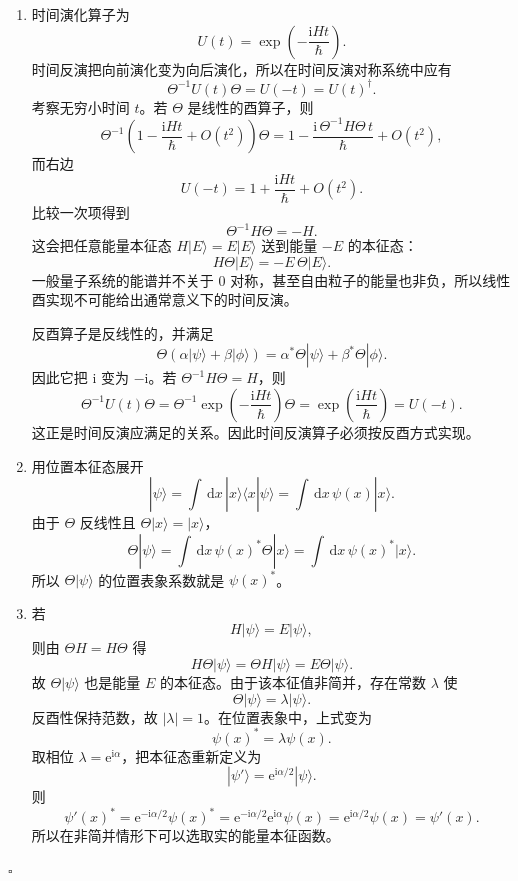 \documentclass[UTF8,12pt]{ctexart}
\newcommand{\dd}{\,\mathrm d}
\newcommand{\ii}{\mathrm i}
\newcommand{\ee}{\mathrm e}
\newenvironment{solution}{%
  \par\medskip
  \noindent{\bfseries 解答}\quad\ignorespaces
}{\hfill$\square$\par\medskip}
\begin{document}
\begin{solution}
\begin{enumerate}[label=(\alph*)]
\item 时间演化算子为
\[
U(t)=\exp\!\left(-\frac{\ii Ht}{\hbar}\right).
\]
时间反演把向前演化变为向后演化，所以在时间反演对称系统中应有
\[
\Theta^{-1}U(t)\Theta=U(-t)=U(t)^\dagger.
\]
考察无穷小时间 \(t\)。若 \(\Theta\) 是线性的酉算子，则
\[
\Theta^{-1}\left(1-\frac{\ii Ht}{\hbar}+O(t^2)\right)\Theta
=1-\frac{\ii\,\Theta^{-1}H\Theta\,t}{\hbar}+O(t^2),
\]
而右边
\[
U(-t)=1+\frac{\ii Ht}{\hbar}+O(t^2).
\]
比较一次项得到
\[
\Theta^{-1}H\Theta=-H.
\]
这会把任意能量本征态 \(H|E\rangle=E|E\rangle\) 送到能量 \(-E\) 的本征态：
\[
H\Theta|E\rangle=-E\,\Theta|E\rangle.
\]
一般量子系统的能谱并不关于 \(0\) 对称，甚至自由粒子的能量也非负，所以线性酉实现不可能给出通常意义下的时间反演。

反酉算子是反线性的，并满足
\[
\Theta(\alpha|\psi\rangle+\beta|\phi\rangle)
=\alpha^*\Theta|\psi\rangle+\beta^*\Theta|\phi\rangle.
\]
因此它把 \(\ii\) 变为 \(-\ii\)。若 \(\Theta^{-1}H\Theta=H\)，则
\[
\Theta^{-1}U(t)\Theta
=\Theta^{-1}\exp\!\left(-\frac{\ii Ht}{\hbar}\right)\Theta
=\exp\!\left(\frac{\ii Ht}{\hbar}\right)=U(-t).
\]
这正是时间反演应满足的关系。因此时间反演算子必须按反酉方式实现。

\item 用位置本征态展开
\[
|\psi\rangle=\int \dd x\, |x\rangle\langle x|\psi\rangle
=\int \dd x\,\psi(x)|x\rangle.
\]
由于 \(\Theta\) 反线性且 \(\Theta|x\rangle=|x\rangle\)，
\[
\Theta|\psi\rangle
=\int \dd x\,\psi(x)^*\Theta|x\rangle
=\int \dd x\,\psi(x)^*|x\rangle.
\]
所以 \(\Theta|\psi\rangle\) 的位置表象系数就是 \(\psi(x)^*\)。

\item 若
\[
H|\psi\rangle=E|\psi\rangle,
\]
则由 \(\Theta H=H\Theta\) 得
\[
H\Theta|\psi\rangle=\Theta H|\psi\rangle=E\Theta|\psi\rangle.
\]
故 \(\Theta|\psi\rangle\) 也是能量 \(E\) 的本征态。由于该本征值非简并，存在常数 \(\lambda\) 使
\[
\Theta|\psi\rangle=\lambda|\psi\rangle.
\]
反酉性保持范数，故 \(|\lambda|=1\)。在位置表象中，上式变为
\[
\psi(x)^*=\lambda\psi(x).
\]
取相位 \(\lambda=\ee^{\ii\alpha}\)，把本征态重新定义为
\[
|\psi'\rangle=\ee^{\ii\alpha/2}|\psi\rangle.
\]
则
\[
\psi'(x)^*
=\ee^{-\ii\alpha/2}\psi(x)^*
=\ee^{-\ii\alpha/2}\ee^{\ii\alpha}\psi(x)
=\ee^{\ii\alpha/2}\psi(x)
=\psi'(x).
\]
所以在非简并情形下可以选取实的能量本征函数。
\end{enumerate}
\end{solution}
\end{document}
